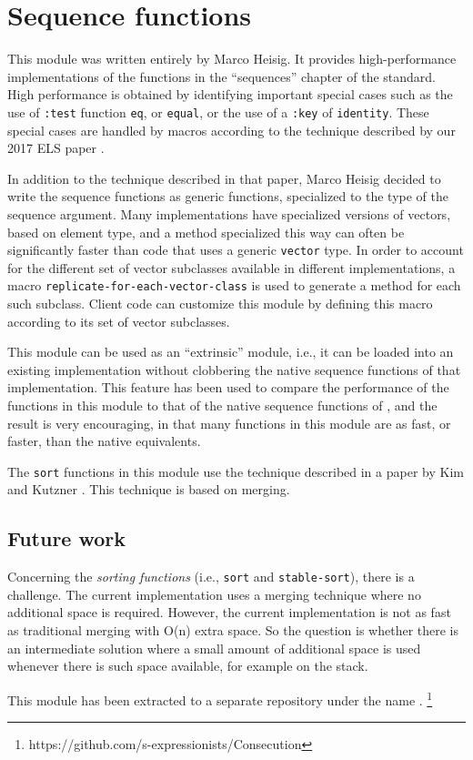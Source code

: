 \chapter{Sequence functions}

This module was written entirely by Marco Heisig.  It provides
high-performance implementations of the functions in the ``sequences''
chapter of the \commonlisp{} standard.  High performance is obtained
by identifying important special cases such as the use of
\texttt{:test} function \texttt{eq}, or \texttt{equal}, or the use of
a \texttt{:key} of \texttt{identity}.  These special cases are handled
by macros according to the technique described by our 2017 ELS paper
\cite{Durand:2017:ELS:Sequence}.

In addition to the technique described in that paper, Marco Heisig
decided to write the sequence functions as generic functions,
specialized to the type of the sequence argument.  Many
implementations have specialized versions of vectors, based on element
type, and a method specialized this way can often be significantly
faster than code that uses a generic \texttt{vector} type.  In order
to account for the different set of vector subclasses available in
different \commonlisp{} implementations, a macro
\texttt{replicate-for-each-vector-class} is used to generate a method
for each such subclass.  Client code can customize this module by
defining this macro according to its set of vector subclasses.

This module can be used as an ``extrinsic'' module, i.e., it can be
loaded into an existing \commonlisp{} implementation without
clobbering the native sequence functions of that implementation.  This
feature has been used to compare the performance of the functions in
this module to that of the native sequence functions of \sbcl{}, and
the result is very encouraging, in that many functions in this module
are as fast, or faster, than the native \sbcl{} equivalents.

The \texttt{sort} functions in this module use the technique described
in a paper by Kim and Kutzner \cite{10.1007/978-3-540-30140-0_63}.
This technique is based on merging.

\section{Future work}
\label{sec-sequence-functions-future-work}

Concerning the \emph{sorting functions} (i.e., \texttt{sort} and
\texttt{stable-sort}), there is a challenge.  The current
implementation uses a merging technique where no additional space is
required.  However, the current implementation is not as fast as
traditional merging with O(n) extra space.  So the question is whether
there is an intermediate solution where a small amount of additional
space is used whenever there is such space available, for example on
the stack.

This module has been extracted to a separate repository under the name
\consecution{}.%
\footnote{https://github.com/s-expressionists/Consecution}

